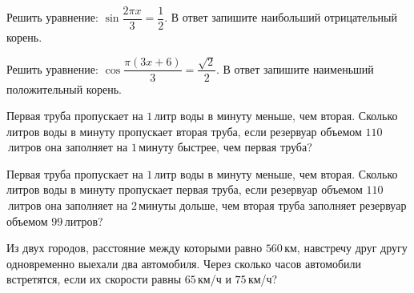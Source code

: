 \begin{class}[number=4]
\begin{listofex}
		\item Решить уравнение: \( \sin\dfrac{2\pi x}{3}=\dfrac{1}{2} \). В ответ запишите наибольший отрицательный корень.
		\item Решить уравнение: \( \cos\dfrac{\pi(3x+6)}{3}=\dfrac{\sqrt{2}}{2} \). В ответ запишите наименьший положительный корень.
		\item Первая труба пропускает на \(1\) литр воды в минуту меньше, чем вторая. Сколько литров воды в минуту пропускает вторая труба, если резервуар объемом \(110\) литров она заполняет на \(1\) минуту быстрее, чем первая труба?
		\item Первая труба пропускает на \(1\) литр воды в минуту меньше, чем вторая. Сколько литров воды в минуту пропускает первая труба, если резервуар объемом \(110\) литров она заполняет на \(2\) минуты дольше, чем вторая труба заполняет резервуар объемом \(99\) литров?
		\item Из двух городов, расстояние между которыми равно \(560\) км, навстречу друг другу одновременно выехали два автомобиля. Через сколько часов автомобили встретятся, если их скорости равны \(65\) км/ч и \(75\) км/ч?
	\end{listofex}
\end{class}

